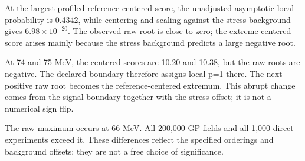 At the largest profiled reference-centered score, the unadjusted asymptotic local probability is 0.4342, while centering and scaling against the stress background gives $6.98\times10^{-20}$. The observed raw root is close to zero; the extreme centered score arises mainly because the stress background predicts a large negative root. 

At 74 and 75 MeV, the centered scores are 10.20 and 10.38, but the raw roots are negative. The declared boundary therefore assigns local p=1 there. The next positive raw root becomes the reference-centered extremum. This abrupt change comes from the signal boundary together with the stress offset; it is not a numerical sign flip. 

The raw maximum occurs at 66 MeV. All 200,000 GP fields and all 1,000 direct experiments exceed it. These differences reflect the specified orderings and background offsets; they are not a free choice of significance.
